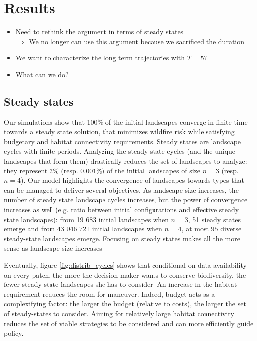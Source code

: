 \section{Results}
\label{section:results}
\begin{itemize}
\item Need to rethink the argument in terms of steady states
\\
$\Rightarrow$ We no longer can use this argument because we sacrificed the duration
\item We want to characterize the long term trajectories with $T=5$?
\item What can we do?
\end{itemize}
\subsection{Steady states}
Our simulations show that 100\% of the initial landscapes converge in finite time towards a steady state solution, that minimizes wildfire risk while satisfying budgetary and habitat connectivity requirements. Steady states are landscape cycles with finite periods. Analyzing the steady-state cycles (and the unique landscapes that form them) drastically reduces the set of landscapes to analyze: they represent 2\% (resp. $0.001\%$) of the initial landscapes of size $n=3$ (resp. $n=4$). Our model highlights the convergence of landscapes towards types that can be managed to deliver several objectives. As landscape size increases, the number of steady state landscape cycles increases, but the power of convergence increases as well (e.g. ratio between initial configurations and effective steady state landscapes): from 19 683 initial landscapes when $n=3$, 51 steady states emerge and from 43 046 721 initial landscapes when $n=4$, at most 95 diverse steady-state landscapes emerge. Focusing on steady states makes all the more sense as landscape size increases. 

Eventually, figure \ref{fig:distrib_cycles} shows that conditional on data availability on every patch, the more the decision maker wants to conserve biodiversity, the fewer steady-state landscapes she has to consider. An increase in the habitat requirement reduces the room for maneuver. Indeed, budget acts as a complexifying factor: the larger the budget (relative to costs), the larger the set of steady-states to consider. 
Aiming for relatively large habitat connectivity reduces the set of viable strategies to be considered and can more efficiently guide policy. 

